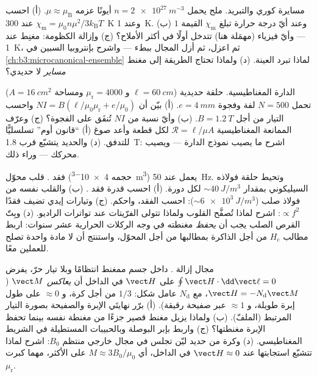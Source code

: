 \begin{exercise}[$\star\star$]\label{exo:b3:electromagnetism-in-matter:9}
مسايرة كوري والتبريد. ملح يحمل $n =
\qty{2e27}{m^{-3}}$ أيونًا عزمه $\mu \approx \mu_{\text{B}}$.
(أ) احسب $\chi_{\text{m}} = \mu_0n\mu^2/3k_{\text{B}}T$ عند
\qty{300}{K} وعند \qty{1}{K}. (ب) وعند أيّ درجة حرارة تبلغ
$\chi_{\text{m}}$ القيمة $1$ --- وأيّ فيزياء (مهمَلة هنا)
تتدخل أولًا في أكثر الأملاح؟ (ج) وإزالة  الكظومة:
مغنِط عند \qty{1}{K}، ثم اعزل، ثم أزل المجال ببطء ---
واشرح بإنتروبيا السبين في
\cref{ch:b3:microcanonical-ensemble} لماذا تبرد العينة. (د) ولماذا
تحتاج الطريقة إلى مغنط \emph{مساير} لا حديدي؟
\end{exercise}

\begin{exercise}[$\star\star\star$]\label{exo:b3:electromagnetism-in-matter:10}
الدارة المغناطيسية. حلقة حديدية ($\ell = \qty{60}{cm}$ و
$\mu_{\text{r}} = 4000$ ومساحة $A = \qty{16}{cm^2}$) تحمل
$N = 500$ لفة وفجوة $e = \qty{4}{mm}$. (أ) بيّن أن $NI =
B(\ell/\mu_0\mu_{\text{r}} + e/\mu_0)$ واحسب التيار من أجل
$B = \qty{1.2}{T}$. (ب) وأيّ نسبة من $NI$ تُنفَق على الفجوة؟
(ج) وعرّف الممانعة المغناطيسية $\mathcal R = \ell/\mu A$ لكل
قطعة وأعد صوغ (أ) ``قانون أوم'' تسلسليًّا للتدفق. (د)
والحديد يتشبّع قرب \qty{1.8}{T}: اشرح ما يصيب
نموذج الدارة --- ويصيب محركك --- وراء ذلك.
\end{exercise}

\begin{exercise}[$\star\star\star$]\label{exo:b3:electromagnetism-in-matter:11}
فقد . قلب محوّل (حجمه \qty{4e-3}{m^3})
يعمل عند \qty{50}{Hz}. وتحيط حلقة فولاذه السيليكوني
بمقدار $\sim\qty{40}{J/m^3}$ لكل دورة. (أ) احسب قدرة فقد
. (ب) والقلب نفسه من فولاذ صلب
($\sim\qty{6e3}{J/m^3}$): احسب الفقد، واحكم. (ج) وتيارات إيدي تضيف
فقدًا $\propto f^2$: اشرح لماذا تُصفَّح القلوب ولماذا
تتولى الفرّيتات عند تواترات الراديو. (د) وبِتّ القرص الصلب يجب أن
\emph{يحفظ} مغنطته في وجه الركلات الحرارية عشر سنوات:
اربط مطالب $H_{\text{c}}$ من أجل الذاكرة بمطالبها من أجل
المحوّل، واستنتج أن لا مادة واحدة تصلح للعملين معًا.
\end{exercise}

\begin{exercise}[$\star\star\star$]\label{exo:b3:electromagnetism-in-matter:12}
مجال إزالة . داخل جسم ممغنط انتظامًا وبلا
تيار حرّ، يفرض $\oint\vect H\cdot\dd\vect\ell = 0$ على
$\vect H$ في الداخل أن \emph{يعاكس} $\vect M$ ($\vect H =
-N_{\text{d}}\vect M$، مع $N_{\text{d}}$ عامل شكل: $1/3$
من أجل كرة، و $\approx 0$ على طول إبرة طويلة، و $\approx 1$ عبر
صفيحة رقيقة). (أ) برّر نهايتَي الإبرة والصفيحة بصورة
التيار المرتبط (الملفّ). (ب) ولماذا يزيل مغنط قصير جزءًا من
مغنطة نفسه بينما تحفظ الإبرة
مغنطتها؟ (ج) واربط بإبر البوصلة وبالحبيبات المستطيلة
في الشريط المغناطيسي. (د) وكرة من حديد ليّن تجلس في مجال خارجي
منتظم $B_0$: اشرح لماذا تتشبّع استجابتها عند $\vect H
\approx 0$ في الداخل، أي $M \approx 3B_0/\mu_0$ على الأكثر، مهما
كبرت $\mu_{\text{r}}$.
\end{exercise}

